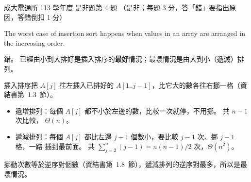 \begin{pastexam}[label={px:ncku-113-cce-04}]{成大電通所 113 學年度 是非題第 4 題}
（是非；每題 3 分，答「錯」要指出原因，答錯倒扣 1 分）

The worst case of insertion sort happens when values in an array are arranged in the
increasing order.
\end{pastexam}

\begin{pastsoln}
錯。 已經由小到大排好是插入排序的\textbf{最好}情況；最壞情況是由大到小（遞減）排列。

插入排序把 $A[j]$ 往左插入已排好的 $A[1..j-1]$，比它大的數各往右挪一格（資結書第~1.3~節）。
\begin{itemize}
\item 遞增排列：每個 $A[j]$ 都不小於左邊的數，比較一次就停，不用挪。 共 $n - 1$ 次比較，
$\Theta(n)$。
\item 遞減排列：每個 $A[j]$ 都比左邊 $j - 1$ 個數小，要比較 $j - 1$ 次、挪 $j - 1$ 格，一路
插到最前面。 共 $\sum_{j=2}^{n}(j - 1) = n(n-1)/2$ 次，$\Theta(n^2)$。
\end{itemize}
挪動次數等於逆序對個數（資結書第~1.8~節），遞減排列的逆序對最多，所以是最壞情況。
\end{pastsoln}
